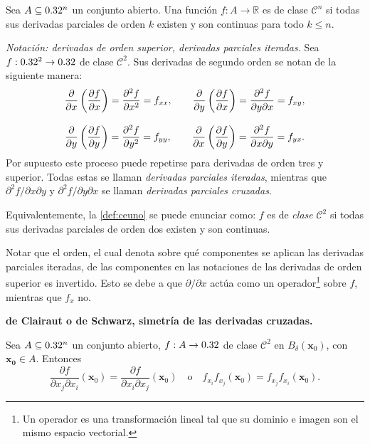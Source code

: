 \begin{definition}
    Sea $A\subseteq0.32^n$ un conjunto abierto. Una función $f: A \to \mathbb{R}$ es de clase $\mathcal{C}^n$ si todas sus derivadas parciales de orden $k$ existen y son continuas para todo $k \leq n$.
\end{definition}

\emph{Notaci\'on: derivadas de orden superior, derivadas parciales iteradas.} Sea $f:0.32^2\to0.32$ de clase $\mathcal{C}^2$. Sus derivadas de segundo orden se notan de la siguiente manera:
\begin{gather*}
    \frac{\partial}{\partial x}\left(\dfrac{\partial f}{\partial x}\right)=
    \frac{\partial^2 f}{\partial x^2}=f_{xx},\qquad
    \frac{\partial}{\partial y}\left(\dfrac{\partial f}{\partial x}\right)=
    \frac{\partial^2 f}{\partial y\partial x}=f_{xy},\\[.3cm]
    \frac{\partial}{\partial y}\left(\dfrac{\partial f}{\partial y}\right)=
    \frac{\partial^2 f}{\partial y^2}=f_{yy},\qquad
    \frac{\partial}{\partial x}\left(\dfrac{\partial f}{\partial y}\right)=
    \frac{\partial^2 f}{\partial x\partial y}=f_{yx}.
\end{gather*}
Por supuesto este proceso puede repetirse para derivadas de orden tres y superior. Todas estas se llaman \emph{derivadas parciales iteradas}, mientras que $\partial^2 f/\partial x\partial y$ y $\partial^2 f/\partial y\partial x$ se llaman \emph{derivadas parciales cruzadas}.  

\begin{obs}
    Equivalentemente, la \autoref{def:ceuno} se puede enunciar como: $f$ es de \emph{clase} $\mathcal{C}^2$ si todas sus derivadas parciales de orden dos existen y son continuas.
\end{obs}

\begin{obs}
    Notar que el orden, el cual denota sobre qu\'e componentes se aplican las derivadas parciales iteradas, de las componentes en las notaciones de las derivadas de orden superior es invertido. Esto se debe a que $\partial/\partial x$ act\'ua como un operador\footnote{Un operador es una transformaci\'on lineal tal que su dominio e imagen son el mismo espacio vectorial.} sobre $f$, mientras que $f_x$ no.  
\end{obs}

\begin{theorem}\textbf{de Clairaut o de Schwarz, simetr\'ia de las derivadas cruzadas.} \label{teo:schwarz}
    
    Sea $A\subseteq0.32^n$ un conjunto abierto, $f:A\to0.32$ de clase $\mathcal{C}^2$ en $B_\delta(\mathbf{x}_0)$, con $\mathbf{x_0}\in A$. Entonces
    \[
        \dfrac{\partial f}{\partial x_j \partial x_i}(\mathbf{x}_0)=\dfrac{\partial f}{\partial x_i \partial x_j}(\mathbf{x}_0)\quad \text{o}\quad f_{x_i}f_{x_j}(\mathbf{x}_0)=f_{x_j}f_{x_i}(\mathbf{x}_0).
    \]
\end{theorem}